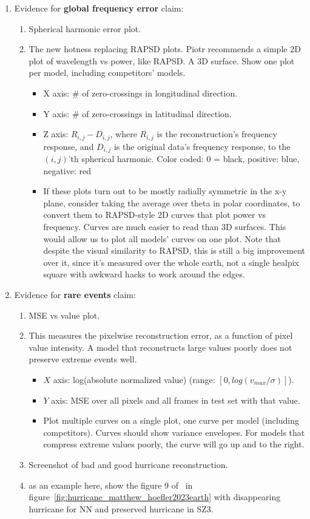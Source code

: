 \begin{enumerate}
    \item Evidence for \textbf{global frequency error} claim:
    \begin{enumerate}
        \item Spherical harmonic error plot. 
        \item[] The new hotness replacing RAPSD plots. Piotr recommends a simple 2D plot of wavelength vs power, like RAPSD. A 3D surface. Show one plot per model, including competitors' models.
        \begin{itemize}
            \item X axis: \# of zero-crossings in longitudinal direction.
            \item Y axis: \# of zero-crossings in latitudinal direction.
            \item Z axis: $R_{i,j} - D_{i, j}$, where $R_{i,j}$ is the reconstruction's frequency response, and $D_{i,j}$ is the original data's frequency response, to the $(i, j)$'th spherical harmonic. Color coded: 0 = black, positive: blue, negative: red
            \item If these plots turn out to be mostly radially symmetric in the x-y plane, consider taking the average over theta in polar coordinates, to convert them to RAPSD-style 2D curves that plot power vs frequency. Curves are much easier to read than 3D surfaces. This would allow us to plot all models' curves on one plot. Note that despite the visual similarity to RAPSD, this is still a big improvement over it, since it's measured over the whole earth, not a single healpix square with awkward hacks to work around the edges.
        \end{itemize} 
    \end{enumerate}
    
    \item Evidence for \textbf{rare events} claim:
    \begin{enumerate}
        \item MSE vs value plot.
        \item[] This measures the pixelwise reconstruction error, as a function of pixel value intensity. A model that reconstructs large values poorly does not preserve extreme events well.
        \begin{itemize}
            \item $X$ axis: log(absolute normalized value) (range: $[0, log(v_{max}/\sigma)]$).
            \item $Y$ axis: MSE over all pixels and all frames in test set with that value.
            \item Plot multiple curves on a single plot, one curve per model (including competitors). Curves should show variance envelopes. For models that compress extreme values poorly, the curve will go up and to the right. 
        \end{itemize}
        \item Screenshot of bad and good hurricane reconstruction.
        \item[] as an example here, show the figure 9 of~\cite{hoefler2023earth} in figure~\ref{fig:hurricane_matthew_hoefler2023earth} with disappearing hurricane for NN and preserved hurricane in SZ3.
        

\end{enumerate}
\end{enumerate}
